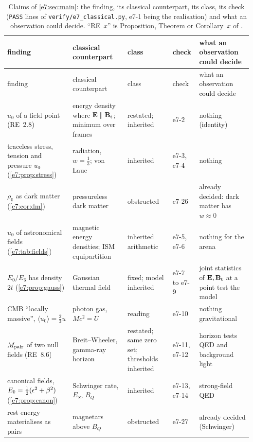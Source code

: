 {\footnotesize
\begin{longtable}{@{}>{\raggedright\arraybackslash}p{3.4cm}>{\raggedright\arraybackslash}p{3.2cm}>{\raggedright\arraybackslash}p{2.6cm}>{\raggedright\arraybackslash}p{1.5cm}>{\raggedright\arraybackslash}p{3.5cm}@{}}
\caption{Claims of \cref{e7:sec:main}: the finding, its classical counterpart, its class, its check (\texttt{PASS} lines of
\texttt{verify/e7\_classical.py}, e7-1 being the realisation) and what an observation could decide. ``RE~$x$'' is Proposition, Theorem or
Corollary~$x$ of \cite{RE}.}
\label{e7:tab:claims}\\
\toprule
finding & classical counterpart & class & check & what an observation could decide\\
\midrule
\endfirsthead
\toprule
finding & classical counterpart & class & check & what an observation could decide\\
\midrule
\endhead
\bottomrule
\endfoot
$u_0$ of a field point (RE~2.8) & energy density where $\mathbf E\parallel\mathbf B_{\rm t}$; minimum over frames & restated; inherited & e7-2 & nothing (identity)\\
traceless stress, tension and pressure $u_0$ (\cref{e7:prop:stress}) & radiation, $w=\tfrac13$; von Laue & inherited & e7-3, e7-4 & nothing\\
$\rho_0$ as dark matter (\cref{e7:cor:dm}) & pressureless dark matter & obstructed & e7-26 & already decided: dark matter has $w\approx0$\\
$u_0$ of astronomical fields (\cref{e7:tab:fields}) & magnetic energy densities; ISM equipartition & inherited arithmetic & e7-5, e7-6 & nothing for the arena\\
$E_0/E_6$ has density $2t$ (\cref{e7:prop:gauss}) & Gaussian thermal field & fixed; model inherited & e7-7 to e7-9 & joint statistics of $\mathbf E,\mathbf B_{\rm t}$ at a point test the model\\
CMB ``locally massive'', $\langle u_0\rangle=\tfrac23u$ & photon gas, $Mc^2=U$ & reading & e7-10 & nothing gravitational\\
$M_{\rm pair}$ of two null fields (RE~8.6) & Breit--Wheeler, gamma-ray horizon & restated; same zero set; thresholds inherited & e7-11, e7-12 & horizon tests QED and background light\\
canonical fields, $E_0=\tfrac12(\epsilon^2+\beta^2)$ (\cref{e7:prop:canon}) & Schwinger rate, $E_S$, $B_Q$ & inherited & e7-13, e7-14 & strong-field QED\\
rest energy materialises as pairs & magnetars above $B_Q$ & obstructed & e7-27 & already decided (Schwinger)\\

\end{longtable}}
